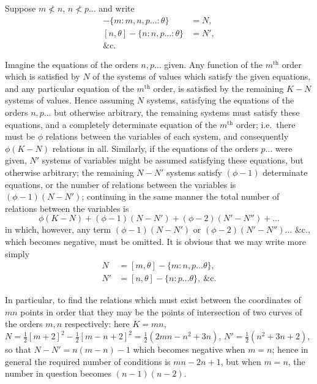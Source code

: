 \documentclass[11pt]{article}
\begin{document}
Suppose $m \not< n$, $n \not< p \ldots$ and write
\begin{align*}
[m, \theta] - \{m : m, n, p \ldots : \theta\} &= N,\\
[n, \theta] - \{n : n, p \ldots : \theta\} &= N',\\
\&\mathrm{c.}
\end{align*}

Imagine the equations of the orders $n, p \ldots$ given. Any function of the $m^{\mathrm{th}}$ order which is satisfied by $N$ of the systems of values which satisfy the given equations, and any particular equation of the $m^{\mathrm{th}}$ order, is satisfied by the remaining $K - N$ systems of values. Hence assuming $N$ systems, satisfying the equations of the orders $n, p \ldots$ but otherwise arbitrary, the remaining systems must satisfy these equations, and a completely determinate equation of the $m^{\mathrm{th}}$ order; i.e.\ there must be $\phi$ relations between the variables of each system, and consequently $\phi(K - N)$ relations in all. Similarly, if the equations of the orders $p \ldots$ were given, $N'$ systems of variables might be assumed satisfying these equations, but otherwise arbitrary; the remaining $N - N'$ systems satisfy $(\phi - 1)$ determinate equations, or the number of relations between the variables is $(\phi - 1)(N - N')$; continuing in the same manner the total number of relations between the variables is
\[
\phi(K - N) + (\phi - 1)(N - N') + (\phi - 2)(N' - N'') + \ldots
\]
in which, however, any term $(\phi - 1)(N - N')$ or $(\phi - 2)(N' - N'') \ldots$ \&c., which becomes negative, must be omitted. It is obvious that we may write more simply
\begin{align*}
N &= [m, \theta] - \{m : n, p \ldots \theta\},\\
N' &= [n, \theta] - \{n : p \ldots \theta\},\ \&\mathrm{c.}
\end{align*}

\newpage
\setcounter{page}{264}

In particular, to find the relations which must exist between the coordinates of $mn$ points in order that they may be the points of intersection of two curves of the orders $m, n$ respectively: here $K = mn$, $N = \tfrac12 [m + 2]^2 - \tfrac12 [m - n + 2]^2 = \tfrac12(2mn - n^2 + 3n)$, $N' = \tfrac12 (n^2 + 3n + 2)$, so that $N - N' = n(m - n) - 1$ which becomes negative when $m = n$; hence in general the required number of conditions is $mn - 2n + 1$, but when $m = n$, the number in question becomes $(n - 1)(n - 2)$.
\end{document}
